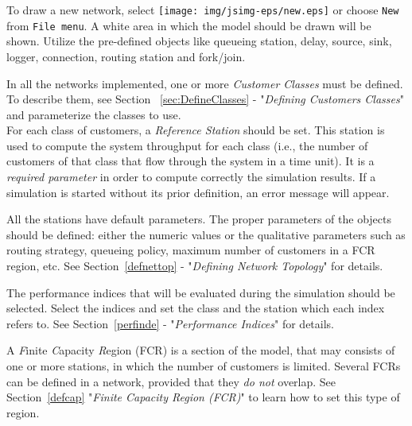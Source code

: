 
To draw a new network, select
\texttt{[image: img/jsimg-eps/new.eps]} or choose
\texttt{New} from \texttt{File menu}.  A white area in which the
model should be drawn will be shown. Utilize the pre-defined objects
like queueing station, delay,
source, sink, logger, connection, routing station and fork/join.


In all the networks implemented, one or more \emph{Customer Classes} must
be defined. To describe them, see Section ~\ref{sec:DefineClasses} -
"\emph{Defining Customers Classes}" and parameterize the classes to use.\\
For each class of customers, a \emph{Reference Station} should be
set. This station is used to compute the system throughput for
each class (i.e., the number of customers of that class that flow
through the system in a time unit). It is a \emph{required
parameter} in order to compute correctly the simulation results.
If a simulation is started without its prior definition, an error
message will appear.


All the stations have default parameters. The proper parameters of
the objects should be defined: either the numeric values or the
qualitative parameters such as routing strategy, queueing policy,
maximum number of customers in a FCR region, etc. See
Section~\ref{defnettop} - "\emph{Defining Network Topology}" for
details.


The performance indices that will be evaluated during the
simulation should be selected. Select the indices and set the
class and the station which each index refers to. See
Section~\ref{perfinde} - "\emph{Performance Indices}" for details.


A \emph{F}inite \emph{C}apacity \emph{R}egion (FCR) is a section
of the model, that may consists of one or more stations, in which
the number of customers is limited. Several FCRs can be defined in
a network, provided that they \emph{do not} overlap. See
Section~\ref{defcap} "\emph{Finite Capacity Region (FCR)}" to
learn how to set this type of region.


